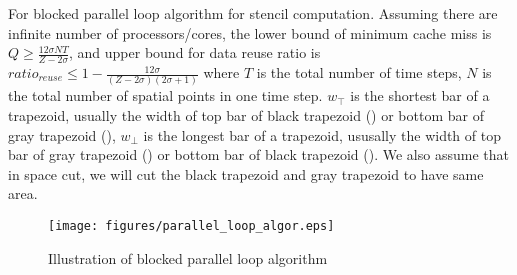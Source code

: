 \begin{theorem}
For blocked parallel loop algorithm for stencil computation. Assuming there
are infinite number of processors/cores, the
lower bound of minimum cache miss is $Q \geq \frac{12 \sigma N T}{Z - 2 \sigma}$, 
and upper bound for data reuse ratio is 
$ratio_{reuse} \leq 1 - \frac{12 \sigma}{(Z - 2 \sigma)(2 \sigma + 1)}$
where $T$ is the total number of
time steps, $N$ is the total number of spatial points in one time
step. $w_{\top}$ is the shortest bar of a trapezoid, usually the width
of top bar of black trapezoid () or bottom bar
of gray trapezoid (), $w_{\bot}$ is the longest
bar of a trapezoid, ususally the width of top bar of gray trapezoid
() or bottom bar of black trapezoid
(). We also assume that in space cut, we will
cut the black trapezoid and gray trapezoid to have same area.
\label{thm:loopAlgor}
\end{theorem}

\begin{figure}[ht]
\centerline{\mbox{\texttt{[image: figures/parallel\_loop\_algor.eps]}}}
\caption{Illustration of blocked parallel loop algorithm}
\label{fig:pLoopAlgor}
\end{figure}


